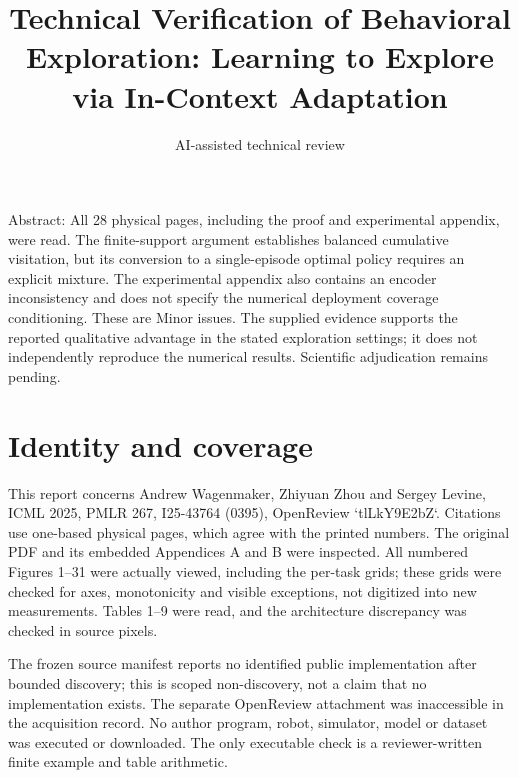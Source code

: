 \documentclass[10pt]{article}
\title{Technical Verification of Behavioral Exploration: Learning to Explore via In-Context Adaptation}
\author{AI-assisted technical review}
\date{}
\begin{document}
\maketitle
Abstract: All 28 physical pages, including the proof and experimental appendix, were read. The finite-support argument establishes balanced cumulative visitation, but its conversion to a single-episode optimal policy requires an explicit mixture. The experimental appendix also contains an encoder inconsistency and does not specify the numerical deployment coverage conditioning. These are Minor issues. The supplied evidence supports the reported qualitative advantage in the stated exploration settings; it does not independently reproduce the numerical results. Scientific adjudication remains pending.\par
\section*{Identity and coverage}
This report concerns Andrew Wagenmaker, Zhiyuan Zhou and Sergey Levine, ICML 2025, PMLR 267, I25-43764 (0395), OpenReview `tlLkY9E2bZ`. Citations use one-based physical pages, which agree with the printed numbers. The original PDF and its embedded Appendices A and B were inspected. All numbered Figures 1–31 were actually viewed, including the per-task grids; these grids were checked for axes, monotonicity and visible exceptions, not digitized into new measurements. Tables 1–9 were read, and the architecture discrepancy was checked in source pixels.\par
The frozen source manifest reports no identified public implementation after bounded discovery; this is scoped non-discovery, not a claim that no implementation exists. The separate OpenReview attachment was inaccessible in the acquisition record. No author program, robot, simulator, model or dataset was executed or downloaded. The only executable check is a reviewer-written finite example and table arithmetic.\par
\end{document}
